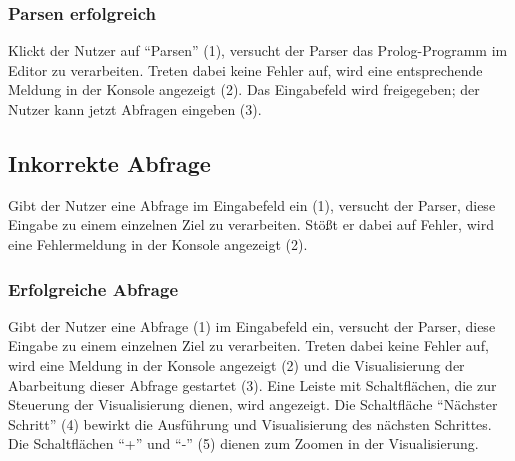 \documentclass[parskip=full,11pt,twoside]{scrartcl}
\begin{document}
\subsubsection{Parsen erfolgreich}

\begin{minipage}{\linewidth}
\end{minipage}

Klickt der Nutzer auf \enquote{Parsen} (1), versucht der Parser das Prolog-Programm im Editor zu verarbeiten.
Treten dabei keine Fehler auf, wird eine entsprechende Meldung in der Konsole angezeigt (2).
Das Eingabefeld wird freigegeben; der Nutzer kann jetzt Abfragen eingeben (3).

\subsection{Inkorrekte Abfrage}

\begin{minipage}{\linewidth}
\end{minipage}

Gibt der Nutzer eine Abfrage im Eingabefeld ein (1), versucht der Parser, diese Eingabe zu einem einzelnen Ziel zu verarbeiten.
Stößt er dabei auf Fehler, wird eine Fehlermeldung in der Konsole angezeigt (2).

\subsubsection{Erfolgreiche Abfrage}

\begin{minipage}{\linewidth}
\end{minipage}

Gibt der Nutzer eine Abfrage (1) im Eingabefeld ein, versucht der Parser, diese Eingabe zu einem einzelnen Ziel zu verarbeiten.
Treten dabei keine Fehler auf, wird eine Meldung in der Konsole angezeigt (2) und die Visualisierung der Abarbeitung dieser Abfrage gestartet (3).
Eine Leiste mit Schaltflächen, die zur Steuerung der Visualisierung dienen, wird angezeigt.
Die Schaltfläche \enquote{Nächster Schritt} (4) bewirkt die Ausführung und Visualisierung des nächsten Schrittes.
Die Schaltflächen \enquote{+} und \enquote{-} (5) dienen zum Zoomen in der Visualisierung.
\end{document}
